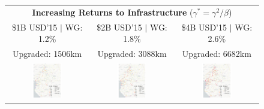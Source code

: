 \documentclass[a4paper]{article}
\begin{document}
\begin{figure}[H]
{\begin{tabular}{@{}c@{}c@{}c@{}}
\multicolumn{3}{c}{\textbf{Increasing Returns to Infrastructure} ($\gamma^* = \gamma^2/\beta$)} \\ [0.5em]
\$1B USD'15 $|$ WG: 1.2\% & \$2B USD'15 $|$ WG: 1.8\% & \$4B USD'15 $|$ WG: 2.6\%  \\
Upgraded: 1506km & Upgraded: 3088km & Upgraded: 6682km \\ 
\includegraphics[width=0.38\textwidth, trim= {0.9cm 0 0.9cm 0}, clip]{"../figures/GE/trans_africa_network_GE_20g_1b_fixed_cgc_irs_sigma3.8_rho0_julia_MACR_90kmh_google_perc_ug.pdf"} & 
\includegraphics[width=0.38\textwidth, trim= {0.9cm 0 0.9cm 0}, clip]{"../figures/GE/trans_africa_network_GE_20g_2b_fixed_cgc_irs_sigma3.8_rho0_julia_MACR_90kmh_google_perc_ug.pdf"} &
\includegraphics[width=0.38\textwidth, trim= {0.9cm 0 0.9cm 0}, clip]{"../figures/GE/trans_africa_network_GE_20g_4b_fixed_cgc_irs_sigma3.8_rho0_julia_MACR_90kmh_google_perc_ug.pdf"} 

\end{tabular}}
\end{figure}
\end{document}
